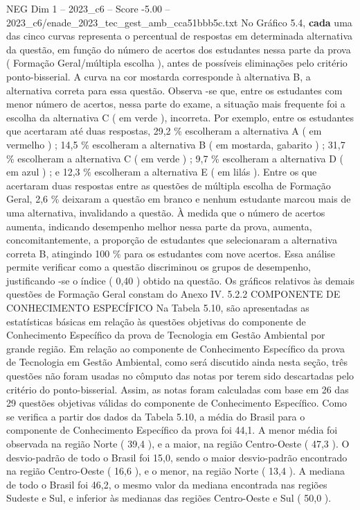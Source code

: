 \begin{textsample}{NEG Dim 1 – 2023\_c6 – Score -5.00 – 2023\_c6/enade\_2023\_tec\_gest\_amb\_cca51bbb5c.txt}
No Gráfico 5.4, \textbf{cada} uma das cinco curvas representa o percentual de respostas em determinada alternativa da questão, em função do número de acertos dos estudantes nessa parte da prova ( Formação Geral/múltipla escolha ), antes de possíveis eliminações pelo critério ponto-bisserial.
A curva na cor mostarda corresponde à alternativa B, a alternativa correta para essa questão.
Observa -se que, entre os estudantes com menor número de acertos, nessa parte do exame, a situação mais frequente foi a escolha da alternativa C ( em verde ), incorreta.
Por exemplo, entre os estudantes que acertaram até duas respostas, 29,2 \% escolheram a alternativa A ( em vermelho ) ; 14,5 \% escolheram a alternativa B ( em mostarda, gabarito ) ; 31,7 \% escolheram a alternativa C ( em verde ) ; 9,7 \% escolheram a alternativa D ( em azul ) ; e 12,3 \% escolheram a alternativa E ( em lilás ).
Entre os que acertaram duas respostas entre as questões de múltipla escolha de Formação Geral, 2,6 \% deixaram a questão em branco e nenhum estudante marcou mais de uma alternativa, invalidando a questão.
À medida que o número de acertos aumenta, indicando desempenho melhor nessa parte da prova, aumenta, concomitantemente, a proporção de estudantes que selecionaram a alternativa correta B, atingindo 100 \% para os estudantes com nove acertos.
Essa análise permite verificar como a questão discriminou os grupos de desempenho, justificando -se o índice ( 0,40 ) obtido na questão.
Os gráficos relativos às demais questões de Formação Geral constam do Anexo IV. 5.2.2 COMPONENTE DE CONHECIMENTO ESPECÍFICO Na Tabela 5.10, são apresentadas as estatísticas básicas em relação às questões objetivas do componente de Conhecimento Específico da prova de Tecnologia em Gestão Ambiental por grande região.
Em relação ao componente de Conhecimento Específico da prova de Tecnologia em Gestão Ambiental, como será discutido ainda nesta seção, três questões não foram usadas no cômputo das notas por terem sido descartadas pelo critério do ponto-bisserial.
Assim, as notas foram calculadas com base em 26 das 29 questões objetivas válidas do componente de Conhecimento Específico.
Como se verifica a partir dos dados da Tabela 5.10, a média do Brasil para o componente de Conhecimento Específico da prova foi 44,1.
A menor média foi observada na região Norte ( 39,4 ), e a maior, na região Centro-Oeste ( 47,3 ).
O desvio-padrão de todo o Brasil foi 15,0, sendo o maior desvio-padrão encontrado na região Centro-Oeste ( 16,6 ), e o menor, na região Norte ( 13,4 ).
A mediana de todo o Brasil foi 46,2, o mesmo valor da mediana encontrada nas regiões Sudeste e Sul, e inferior às medianas das regiões Centro-Oeste e Sul ( 50,0 ).

\end{textsample}
